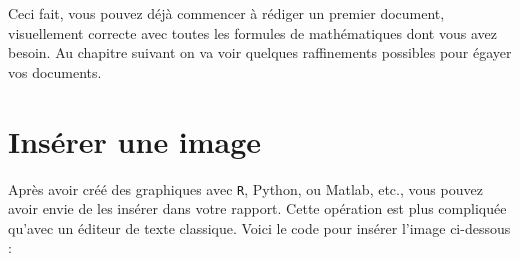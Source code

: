Ceci fait, vous pouvez déjà commencer à rédiger un premier document, visuellement correcte avec
toutes les formules de mathématiques dont vous avez besoin. Au chapitre suivant on va voir 
quelques raffinements possibles pour égayer vos documents.



\section{Insérer une image }

Après avoir créé des graphiques avec \lstinline+R+, Python, ou Matlab, etc.,  vous pouvez avoir 
envie de les insérer dans votre rapport. Cette opération est plus compliquée qu'avec un éditeur 
de texte classique. Voici le code pour insérer l'image ci-dessous : \medskip
